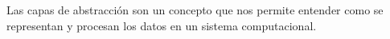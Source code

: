\documentclass[preview]{standalone}
\begin{document}
\begin{center}
Las capas de abstracción son un
concepto que nos permite entender como
se representan y procesan los datos en
un sistema computacional.
\end{center}
\end{document}
